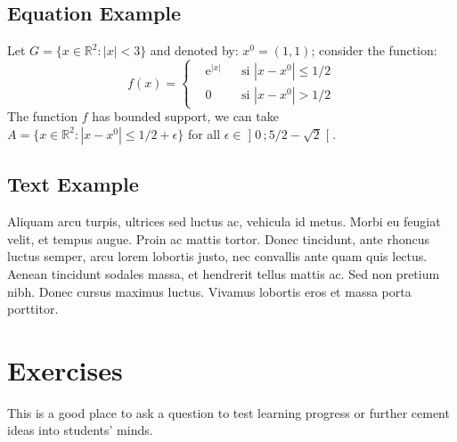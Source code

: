 \documentclass[
	11pt, %
	fleqn, %
	a4paper, %
	oneside, %
]{LegrandOrangeBook}
\begin{document}
\subsection{Equation Example}

\begin{example} %
	Let $G=\{x\in\mathbb{R}^2:|x|<3\}$ and denoted by: $x^0=(1,1)$; consider the function:
	\begin{equation}
	f(x)=\left\{\begin{aligned} & \mathrm{e}^{|x|} & & \text{si $|x-x^0|\leq 1/2$}\\
	& 0 & & \text{si $|x-x^0|> 1/2$}\end{aligned}\right.
	\end{equation}
	The function $f$ has bounded support, we can take $A=\{x\in\mathbb{R}^2:|x-x^0|\leq 1/2+\epsilon\}$ for all $\epsilon\in\mathopen{]}0\,;5/2-\sqrt{2}\mathclose{[}$.
\end{example}

\subsection{Text Example}

\begin{example}[Example name] %
	Aliquam arcu turpis, ultrices sed luctus ac, vehicula id metus. Morbi eu feugiat velit, et tempus augue. Proin ac mattis tortor. Donec tincidunt, ante rhoncus luctus semper, arcu lorem lobortis justo, nec convallis ante quam quis lectus. Aenean tincidunt sodales massa, et hendrerit tellus mattis ac. Sed non pretium nibh. Donec cursus maximus luctus. Vivamus lobortis eros et massa porta porttitor.
\end{example}


\section{Exercises}

\begin{exercise} %
	This is a good place to ask a question to test learning progress or further cement ideas into students' minds.
\end{exercise}

\end{document}
